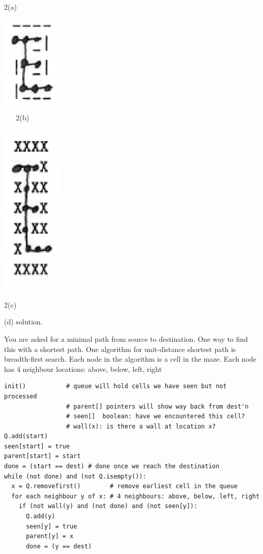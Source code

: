 \documentclass[12pt]{article}
\begin{document}
\vfill~
\newpage
\begin{minipage}[c]{1cm}
2(a) 
\end{minipage}
\begin{minipage}[c]{3cm}
\includegraphics[width=30mm]{maze/a.eps}\
\end{minipage}
\begin{minipage}[c]{2cm}
~ ~ 2(b) 
\end{minipage}
\begin{minipage}[c]{3cm}
\includegraphics[width=30mm]{maze/b.eps}\
\end{minipage}

\vfill

2(c)

\vfill

(d) solution.

You are asked for a minimal path from source to destination.
One way to find this with a shortest path.
One algorithm for unit-distance shortest path is breadth-first search.
Each node in the algorithm is a cell in the maze.
Each node has 4 neighbour locations: above, below, left, right

\begin{verbatim}
init()           # queue will hold cells we have seen but not processed
                 # parent[] pointers will show way back from dest'n
                 # seen[]  boolean: have we encountered this cell?
                 # wall(x): is there a wall at location x?
Q.add(start)
seen[start] = true
parent[start] = start  
done = (start == dest) # done once we reach the destination
while (not done) and (not Q.isempty()):
  x = Q.removefirst()        # remove earliest cell in the queue
  for each neighbour y of x: # 4 neighbours: above, below, left, right
    if (not wall(y) and (not done) and (not seen[y]): 
      Q.add(y)
      seen[y] = true
      parent[y] = x
      done = (y == dest)
\end{verbatim}
\end{document}

